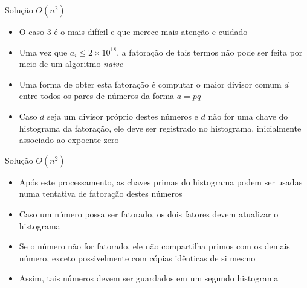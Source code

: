 \begin{frame}[fragile]{Solução $O(n^2)$}

    \begin{itemize}
        \item O caso 3 é o mais difícil e que merece mais atenção e cuidado

        \item Uma vez que $a_i \leq 2\times 10^{18}$, a fatoração de tais termos não pode ser
            feita por meio de um algoritmo \textit{naive}

        \item Uma forma de obter esta fatoração é computar o maior divisor comum $d$ entre todos os
            pares de números da forma $a = pq$

        \item Caso $d$ seja um divisor próprio destes números e $d$ não for uma chave do 
            histograma da fatoração, ele deve ser registrado no histograma, inicialmente 
            associado ao expoente zero
    \end{itemize}

\end{frame}

\begin{frame}[fragile]{Solução $O(n^2)$}

    \begin{itemize}
        \item Após este processamento, as chaves primas do histograma podem ser usadas numa 
            tentativa de fatoração destes números

        \item Caso um número possa ser fatorado, os dois fatores devem atualizar o histograma

        \item Se o número não for fatorado, ele não compartilha primos com os demais número,
            exceto possivelmente com cópias idênticas de si mesmo

        \item Assim, tais números devem ser guardados em um segundo histograma
    \end{itemize}

\end{frame}

